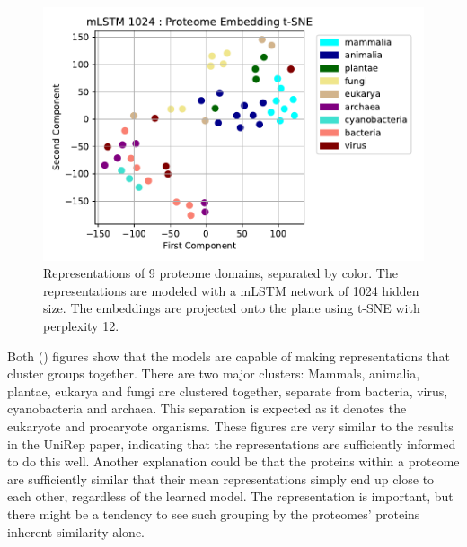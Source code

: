 \documentclass[a4paper,12pt]{article}
\begin{document}
\begin{figure}[H]
    \centering
    \includegraphics[width=0.95\linewidth]{figures/fig2b_mLSTM_1024_no_trunc.pdf}
    \caption{Representations of 9 proteome domains, separated by color. The representations are modeled with a mLSTM network of 1024 hidden size. The embeddings are projected onto the plane using t-SNE with perplexity 12.}
    \label{fig:fig2b_mLSTM}
\end{figure}

Both () figures show that the models are capable of making representations that cluster groups together. There are two major clusters: Mammals, animalia, plantae, eukarya and fungi are clustered together, separate from bacteria, virus, cyanobacteria and archaea. This separation is expected as it denotes the eukaryote and procaryote organisms. These figures are very similar to the results in the UniRep paper, indicating that the representations are sufficiently informed to do this well. Another explanation could be that the proteins within a proteome are sufficiently similar that their mean representations simply end up close to each other, regardless of the learned model. The representation is important, but there might be a tendency to see such grouping by the proteomes' proteins inherent similarity alone.
\end{document}
